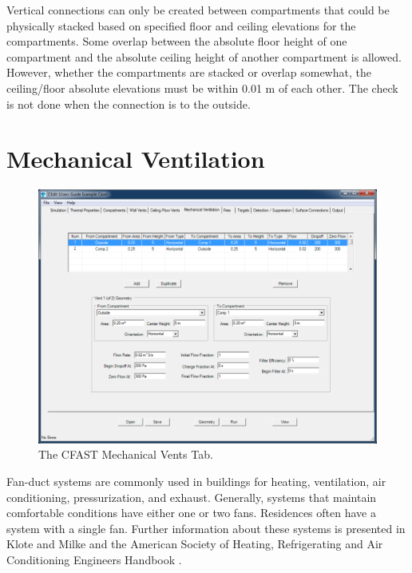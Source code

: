 Vertical connections can only be created between compartments that could be physically stacked based on specified floor and ceiling elevations for the compartments.  Some overlap between the absolute floor height of one compartment and the absolute ceiling height of another compartment is allowed.  However, whether the compartments are stacked or overlap somewhat, the ceiling/floor absolute elevations must be within 0.01 m of each other. The check is not done when the connection is to the outside.


\chapter{Mechanical Ventilation}

\begin{figure}[h!]
\begin{center}
\includegraphics[width=6.5in]{FIGURES/Mechanical_Vent_Tab}
\caption[The CFAST Mechanical Vents Tab]{The CFAST Mechanical Vents Tab.}
\end{center}
\end{figure}

Fan-duct systems are commonly used in buildings for heating, ventilation, air conditioning, pressurization, and exhaust. Generally, systems that maintain comfortable conditions have either one or two fans.  Residences often have a system with a single fan. Further information about these systems is presented in  Klote and Milke \cite{Klote:2002} and the American Society of Heating, Refrigerating and Air Conditioning Engineers Handbook \cite{ASHRAE:2001}.

